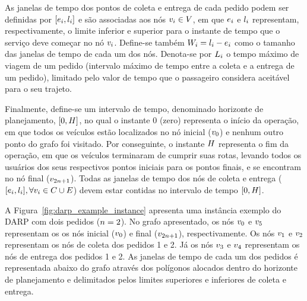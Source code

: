 As janelas de tempo dos pontos de coleta e entrega de cada pedido podem ser
definidas por $[e_{i},l_{i}]$ e são 
associadas aos nós $v_{i} \in V$, em que $e_{i}$ e 
$l_{i}$ representam, respectivamente, o limite inferior e 
superior para o instante de tempo que o serviço deve começar no nó $v_{i}$.
Define-se também $W_{i} = l_{i} 
- e_{i}$ como o tamanho das janelas de tempo 
de cada um dos nós. Denota-se por $L_i$ o tempo máximo de 
viagem de um pedido (intervalo máximo de tempo entre a coleta e a entrega de um
pedido), limitado pelo valor de tempo que o passageiro considera 
aceitável para o seu trajeto. 

Finalmente, define-se um intervalo de tempo, denominado horizonte de
planejamento, $[0, H]$, no qual o instante $0$ (zero) representa
o início da operação, em que todos os veículos estão localizados no nó inicial 
($v_{0}$) e nenhum outro ponto do grafo foi visitado.
Por conseguinte, o instante $H$ representa o fim da operação, 
em que os veículos terminaram de cumprir suas rotas, levando todos os usuários 
dos seus respectivos pontos iniciais para os pontos finais, e se 
encontram no nó final ($v_{2n + 1}$). Todas as janelas de tempo dos nós de
coleta e entrega ($[e_i, l_i], 
\forall v_{i} \in C \cup E$) devem estar contidas 
no intervalo de tempo $[0, H]$.

A Figura~\ref{fig:darp_example_instance} apresenta uma instância exemplo
do DARP com dois pedidos ($n = 2$). 
No grafo apresentado, os nós $v_{0}$ e $v_{5}$ representam os os nós 
inicial ($v_{0}$) e final ($v_{2n + 1}$), respectivamente.
Os nós $v_{1}$ e $v_{2}$ representam os nós de coleta dos pedidos 1 e 2.
Já os nós $v_{3}$ e $v_{4}$ representam os nós de entrega dos pedidos 1 e
2.
As janelas de tempo de cada um dos pedidos é representada abaixo do grafo
através dos polígonos alocados dentro do horizonte de planejamento e
delimitados pelos limites superiores e inferiores de coleta e entrega.

